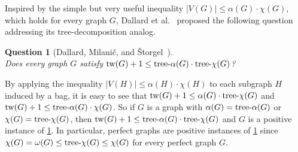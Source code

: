 \documentclass[a4paper, cleveref, autoref, thm-restate]{lipics-v2021}
\newtheorem{question}{Question}
\newcommand{\twG}{{\rm tw}(G)}
\newcommand{\tw}{{\rm tw}}
\newcommand{\treeaG}{{\rm tree\textnormal{-}}\alpha(G)}
\newcommand{\treea}{{\rm tree}\textnormal{-}\alpha}
\newcommand{\treex}{{\rm tree}\textnormal{-}\chi}
\newcommand{\treexG}{{\rm tree\textnormal{-}}\chi(G)}
\begin{document}



Inspired by the simple but very useful inequality $|V(G)| \leq \alpha(G) \cdot \chi(G)$, which holds for every graph $G$, Dallard et al.\ \cite{DMS-24} proposed the following question addressing its tree-decomposition analog.

\begin{question}[{Dallard, Milani\v{c}, and \v{S}torgel~\cite[Question 8.4]{DMS-24}}]{\ \\}\label{que:main-question}%
    Does every graph $G$ satisfy $\twG+1 \leq \treeaG \cdot \treexG$?
\end{question}

By applying the inequality $|V(H)| \leq \alpha(H) \cdot \chi(H)$ to each subgraph $H$ induced by a bag, it is easy to see that $\tw(G)+1 \leq \alpha(G) \cdot \treex(G)$ and $\tw(G)+1 \leq \treea(G) \cdot \chi(G)$.
So if $G$ is a graph with $\alpha(G)=\treea(G)$ or $\chi(G)=\treex(G)$, then $\twG+1 \leq \treeaG \cdot \treexG$ and $G$ is a positive instance of \cref{que:main-question}.
In particular, perfect graphs are positive instances of \cref{que:main-question} since $\chi(G) = \omega(G) \leq \treex(G) \leq \chi(G)$ for every perfect graph $G$.
\end{document}
